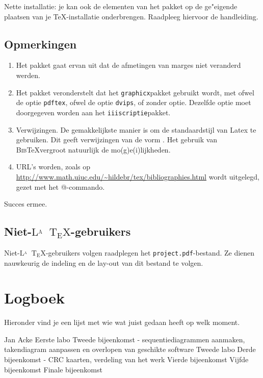 \documentclass[a4paper,oneside]{report}
\def\latex{$\mathrm{L\!\!^{{}_{\scriptstyle A}} \!\!\!\!\!\;\; T\!_{\displaystyle E} \!
X}$}
\begin{document}
Nette installatie: je kan ook de elementen van het pakket op de ge"eigende plaatsen van
je \TeX-installatie onderbrengen. Raadpleeg hiervoor de handleiding.
\section{Opmerkingen}
\begin{enumerate}
\item Het pakket gaat ervan uit dat de afmetingen van marges niet veranderd werden.
\item Het pakket veronderstelt dat het {\tt graphicx}pakket gebruikt wordt, met ofwel de
optie {\tt pdftex}, ofwel de optie {\tt dvips}, of zonder optie. Dezelfde optie moet doorgegeven worden
aan het {\tt iiiscriptie}pakket.
\item Verwijzingen.
De gemakkelijkste manier is om de standaardstijl van Latex te gebruiken. Dit geeft 
verwijzingen van de vorm \cite{Mmils}.
Het gebruik van \textsc{Bib}\TeX vergroot natuurlijk de mo(g)e(i)lijkheden.
\item URL's worden, zoals op \url{http://www.math.uiuc.edu/~hildebr/tex/bibliographies.html}
wordt uitgelegd, gezet met het \verb@\url{}@-commando.
\end{enumerate}
Succes ermee.
\section{Niet-\latex-gebruikers}
Niet-\latex-gebruikers volgen raadplegen het {\tt project.pdf}-bestand. Ze
dienen nauwkeurig de indeling en de lay-out van dit bestand te volgen.

\chapter{Logboek}
Hieronder vind je een lijst met wie wat juist gedaan heeft op welk moment.
\begin{studentlog}{Jan Acke}
{Eerste labo}
{Tweede bijeenkomst - sequentiediagrammen aanmaken, takendiagram aanpassen en overlopen van geschikte software}
{Tweede labo}
{Derde bijeenkomst - CRC kaarten, verdeling van het werk}
{Vierde bijeenkomst}
{Vijfde bijeenkomst}
{Finale bijeenkomst}
\end{studentlog}
\end{document}
